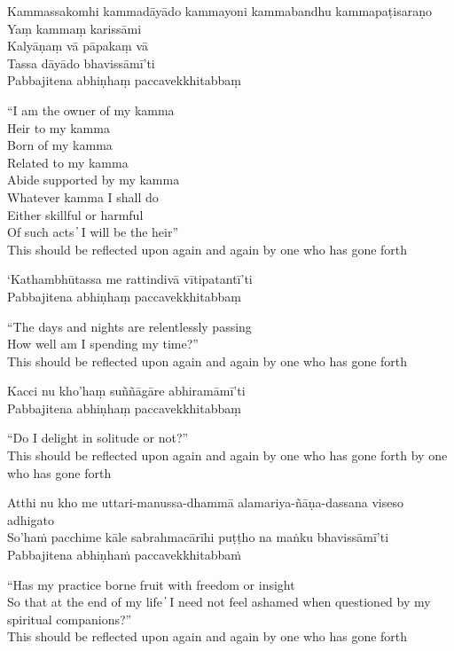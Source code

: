 Kammassakomhi kammadāyādo kammayoni kammabandhu kammapaṭisaraṇo\\
Yaṃ kammaṃ karissāmi\\
Kalyāṇaṃ vā pāpakaṃ vā\\
Tassa dāyādo bhavissāmī'ti\\
Pabbajitena abhiṇhaṃ paccavekkhitabbaṃ

\begin{english}
  “I am the owner of my kamma\\
  Heir to my kamma\\
  Born of my kamma\\
  Related to my kamma\\
  Abide supported by my kamma\\
  Whatever kamma I shall do\\
  Either skillful or harmful\\
  Of such acts  ̓  I will be the heir”\\
  This should be reflected upon again and again by one who has gone forth
\end{english}

`Kathambhūtassa me rattindivā vītipatantī'ti\\
Pabbajitena abhiṇhaṃ paccavekkhitabbaṃ

\begin{english}
  “The days and nights are relentlessly passing\\
  How well am I spending my time?”\\
  This should be reflected upon again and again by one who has gone forth
\end{english}

Kacci nu kho'haṃ suññāgāre abhiramāmī'ti\\
Pabbajitena abhiṇhaṃ paccavekkhitabbaṃ

\begin{english}
  “Do I delight in solitude or not?”\\
  This should be reflected upon again and again by one who has gone forth by one who has gone forth
\end{english}

Atthi nu kho me uttari-manussa-dhammā alamariya-ñāṇa-dassana viseso adhigato\\
So’haṁ pacchime kāle sabrahmacārīhi puṭṭho na maṅku bhavissāmī’ti\\
Pabbajitena abhiṇhaṁ paccavekkhitabbaṁ

\begin{english}
  “Has my practice borne fruit with freedom or insight\\
  So that at the end of my life  ̓  I need not feel ashamed when questioned by my spiritual companions?”\\
  This should be reflected upon again and again by one who has gone forth
\end{english}

